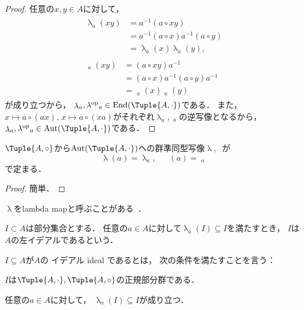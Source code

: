 \documentclass{jlreq}
\newcommand{\Term}[2][\relax]{%
	\textsf{#2} \if#1\relax\else{（\textsf{#1}）}\fi%
}
\DeclareMathOperator{\LambdaMap}{\lambda}
\DeclareMathOperator{\LambdaMapOp}{\lambda^{\mathrm{op}}}
\begin{document}
	\begin{proof}
		任意の$x, y \in A$に対して，
		\begin{gather}
			\begin{aligned}
				\LambdaMap_a(xy)
				&= a^{-1} (a \circ x y) \\
				&= a^{-1} (a \circ x) a^{-1} (a \circ y) \\
				&= \LambdaMap_a(x) \LambdaMap_a(y),
			\end{aligned} \\
			\begin{aligned}
				\LambdaMapOp_a(xy)
				&= (a \circ x y) a^{-1} \\
				&= (a \circ x) a^{-1} (a \circ y) a^{-1} \\
				&= \LambdaMapOp_a(x) \LambdaMapOp_a(y)
			\end{aligned}
		\end{gather}
		が成り立つから，
		$\LambdaMap_a, \LambdaMapOp_a \in \End(\Tuple{A, \cdot})$である．
		また，
		$x \mapsto \overline{a} \circ (a x),\, x \mapsto \overline{a} \circ (x a)$がそれぞれ$\LambdaMap_a, \LambdaMapOp_a$の逆写像となるから，
		$\LambdaMap_a, \LambdaMapOp_a \in \Aut(\Tuple{A, \cdot})$である．
	\end{proof}
	
	\begin{proposition}
		$\Tuple{A, \circ}$から$\Aut(\Tuple{A, \cdot})$への群準同型写像$\LambdaMap, \LambdaMapOp$が
		\begin{equation}
			\LambdaMap(a) = \LambdaMap_a, \quad \LambdaMapOp(a) = \LambdaMapOp_a
		\end{equation}
		で定まる．
	\end{proposition}
	
	\begin{proof}
		簡単．
	\end{proof}
	
	$\LambdaMap$をlambda mapと呼ぶことがある~\cite{kozakai2024}．
	
	\begin{definition}
		$I \subset A$は部分集合とする．
		任意の$a \in A$に対して$\LambdaMap_a(I) \subseteq I$を満たすとき，
		$I$は$A$の左イデアルであるという．
	\end{definition}
	
	\begin{definition}
		$I \subseteq A$が$A$の\Term[ideal]{イデアル}であるとは，
		次の条件を満たすことを言う：
		\begin{defenum}
			\item $I$は$\Tuple{A, \cdot}, \Tuple{A, \circ}$の正規部分群である．
			\item\label{def:skew_brace_ideal_2} 任意の$a \in A$に対して，
			$\LambdaMap_a(I) \subseteq I$が成り立つ．
		\end{defenum}
	\end{definition}
	
\end{document}
